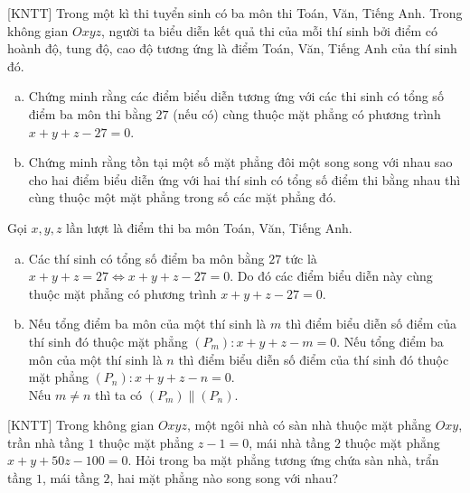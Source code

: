 \begin{bt}%
	[KNTT]
	Trong một kì thi tuyển sinh có ba môn thi Toán, Văn, Tiếng Anh. Trong không gian $Oxyz$, người ta biểu diễn kết quả thi của mỗi thí sinh bởi điểm có hoành độ, tung độ, cao độ tương ứng là điểm Toán, Văn, Tiếng Anh của thí sinh đó.
	\begin{enumerate}[a)]
		\item  Chứng minh rằng các điểm biểu diễn tương ứng với các thi sinh có tổng số điểm ba môn thi bằng $27$ (nếu có) cùng thuộc mặt phẳng có phương trình $x+y+z-27=0$.
		\item  Chứng minh rằng tồn tại một số mặt phẳng đôi một song song với nhau sao cho hai điểm biểu diễn ứng với hai thí sinh có tổng số điểm thi bằng nhau thì cùng thuộc một mặt phẳng trong số các mặt phẳng đó.		 
	\end{enumerate}
	\loigiai
	{
		Gọi $x,y,z$ lần lượt là điểm thi ba môn Toán, Văn, Tiếng Anh. 
		\begin{enumerate}[a)]
			\item Các thí sinh có tổng số điểm ba môn bằng $27$ tức là $x+y+z=27 \Leftrightarrow x+y+z-27=0$. Do đó các điểm biểu diễn này cùng thuộc mặt phẳng có phương trình $x+y+z-27=0$.
			\item Nếu tổng điểm ba môn của một thí sinh là $m$ thì điểm biểu diễn số điểm của thí sinh đó thuộc mặt phẳng $(P_m)\colon x+y+z-m=0$. Nếu tổng điểm ba môn của một thí sinh là $n$ thì điểm biểu diễn số điểm của thí sinh đó thuộc mặt phẳng $(P_n)\colon x+y+z-n=0$.\\
			Nếu $m\ne n$ thì ta có $(P_m)\parallel (P_n)$.
		\end{enumerate}
	}
\end{bt}

\begin{bt}%
	[KNTT]
	Trong không gian $Oxyz$, một ngôi nhà có sàn nhà thuộc mặt phẳng $Oxy$, trần nhà tầng $1$ thuộc mặt phẳng $z-1=0$, mái nhà tầng $2$ thuộc mặt phẳng $x+y+50z-100=0$. Hỏi trong ba mặt phẳng tương ứng chứa sàn nhà, trẩn tầng $1$, mái tầng $2$, hai mặt phẳng nào song song với nhau?
\end{bt}


